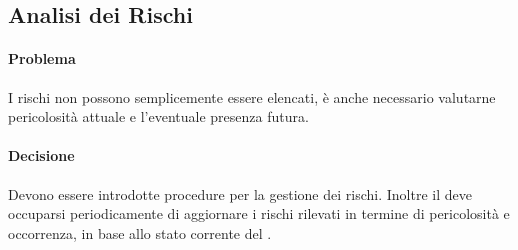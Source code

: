 \subsection{Analisi dei Rischi}
\paragraph{Problema} I rischi non possono semplicemente essere elencati, è anche necessario valutarne pericolosità attuale e l'eventuale presenza futura.
\paragraph{Decisione} Devono essere introdotte procedure per la gestione dei rischi. Inoltre il \rRP deve occuparsi periodicamente di aggiornare i rischi rilevati in termine di pericolosità e occorrenza, in base allo stato corrente del .
